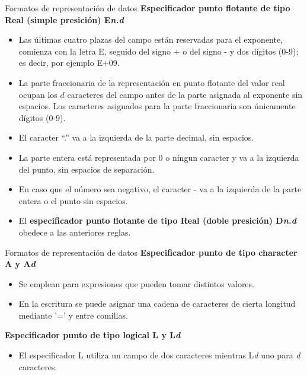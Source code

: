 \begin{frame}[fragile]{Formatos de representación de datos} 
  \textbf{Especificador punto flotante de tipo Real (simple presición) E\textit{n.d}}
    \begin{itemize}[<+(1)->] 
        \item Las últimas cuatro plazas del campo están reservadas para el exponente, comienza con la letra E, seguido del signo + o del signo - y dos dígitos (0-9); es decir, por ejemplo E+09.
        \item La parte fraccionaria de la representación en punto flotante del valor real ocupan los $d$ caracteres del campo antes de la parte asignada al exponente sin espacios. Los caracteres asignados para la parte fraccionaria son únicamente dígitos (0-9).
        \item El caracter “.” va a la izquierda de la parte decimal, sin espacios.
        \item La parte entera está representada por 0 o níngun caracter y va a la izquierda del punto, sin espacios de separación.
        \item En caso que el número sea negativo, el caracter - va a la izquierda de la parte entera o el punto sin espacios.
        \item El \textbf{especificador punto flotante de tipo Real (doble presición) D\textit{n.d}} obedece a las anteriores reglas.
    \end{itemize}
\end{frame}

\begin{frame}[fragile]{Formatos de representación de datos} 
  \textbf{Especificador punto de tipo character A y A\textit{d}}
    \begin{itemize}[<+(1)->] 
        \item Se emplean para expresiones que pueden tomar distintos valores.
        \item En la escritura se puede asignar una cadena de caracteres de cierta longitud mediante '=' y entre comillas.
    \end{itemize}
  \textbf{Especificador punto de tipo logical L y L\textit{d}}
    \begin{itemize}[<+(2)->] 
        \item El especificador L utiliza un campo de dos caracteres mientras L\textit{d} uno para \textit{d} caracteres.
    \end{itemize}
\end{frame}

